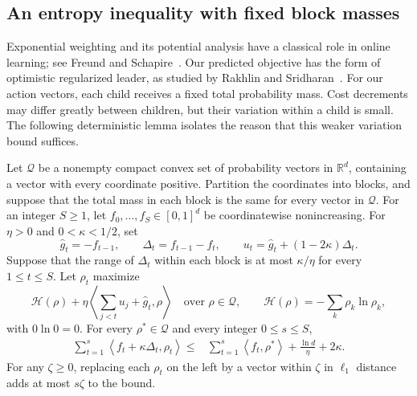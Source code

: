 \subsection{An entropy inequality with fixed block masses}

Exponential weighting and its potential analysis have a classical role in
online learning; see Freund and Schapire~\cite{FreundSchapire1997}.
Our predicted objective has the form of optimistic regularized leader,
as studied by Rakhlin and Sridharan~\cite[Section~2]{RakhlinSridharan2013}.
For our action vectors, each child receives a fixed total probability mass.
Cost decrements may differ greatly between children, but their variation
within a child is small.  The following deterministic lemma isolates the
reason that this weaker variation bound suffices.

\begin{lemma}\label{lem:entropy}
Let $\mathcal Q$ be a nonempty compact convex set of probability vectors
in $\mathbb R^d$, containing a vector with every coordinate positive.
Partition the coordinates into blocks, and suppose that the total mass
in each block is the same for every vector in $\mathcal Q$.
For an integer $S\ge1$, let $f_0,\ldots,f_S\in[0,1]^d$ be
coordinatewise nonincreasing.
For $\eta>0$ and $0<\kappa<1/2$, set
\[
 \widehat g_t=-f_{t-1},\qquad
 \Delta_t=f_{t-1}-f_t,\qquad
 u_t=\widehat g_t+(1-2\kappa)\Delta_t.
\]
Suppose that the range of $\Delta_t$ within each block is at most
$\kappa/\eta$ for every $1\le t\le S$.  Let $\rho_t$ maximize
\[
 \mathcal H(\rho)+
 \eta\left\langle\sum_{j<t}u_j+\widehat g_t,\rho\right\rangle
 \quad\text{over }\rho\in\mathcal Q,
 \qquad \mathcal H(\rho)=-\sum_k\rho_k\ln\rho_k,
\]
with $0\ln0=0$.  For every $\rho^*\in\mathcal Q$ and every integer
$0\le s\le S$,
\begin{equation}\label{eq:entropy-regret}
\begin{split}
 \sum_{t=1}^s
 \left\langle f_t+\kappa\Delta_t,\rho_t\right\rangle
 \le {}&
 \sum_{t=1}^s
 \left\langle f_t,\rho^*\right\rangle
 +\frac{\ln d}{\eta}+2\kappa.
\end{split}
\end{equation}
For any $\zeta\ge0$, replacing each $\rho_t$ on the left by a vector
within $\zeta$ in $\ell_1$ distance adds at most $s\zeta$ to the bound.
\end{lemma}

